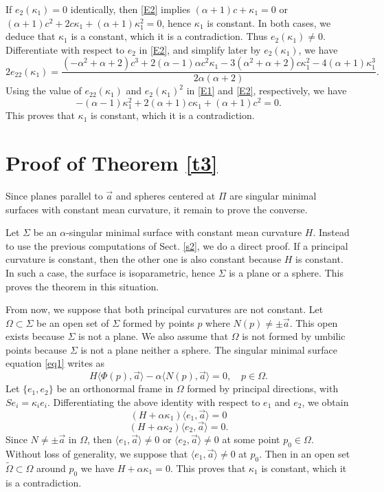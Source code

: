 \documentclass{birkjour}
\theoremstyle{definition}
\theoremstyle{remark}
\numberwithin{equation}{section}
\begin{document}
If $e_2(\kappa_1)=0$ identically, then \eqref{E2} implies $(\alpha+1)c+\kappa_1=0$ or $(\alpha +1) c^2+2 c \kappa_1+(\alpha +1)\kappa_1^2=0$, hence $\kappa_1$ is constant. In both cases, we deduce that $\kappa_1$ is a constant, which it is a contradiction. Thus $e_2(\kappa_1)\not=0$.  Differentiate  with respect to $e_2$ in \eqref{E2}, and   simplify later  by $e_2(\kappa_1)$, we have 
 $$2 e_{22}(\kappa_1)= \frac{\left(-\alpha ^2+\alpha +2\right) c^3+2 (\alpha -1) \alpha  c^2 \kappa_1-3 \left(\alpha ^2+\alpha +2\right) c \kappa_1^2-4 (\alpha +1) \kappa_1^3}{2 \alpha  (\alpha +2)}.$$
Using the value of $e_{22}(\kappa_1)$ and $e_2(\kappa_1)^2$ in \eqref{E1} and \eqref{E2}, respectively, we have 
 $$-(\alpha -1) \kappa_1^2+2 (\alpha +1) c \kappa_1+(\alpha +1) c^2=0.$$
 This proves that $\kappa_1$ is constant, which it is a contradiction.
\section{Proof of Theorem \ref{t3}}\label{s6}

Since planes parallel to $\vec{a}$ and spheres centered at $\Pi$ are singular minimal surfaces with constant mean curvature, it remain to prove the converse. 

  Let $\Sigma$ be an $\alpha$-singular minimal surface with  constant mean curvature $H$.     Instead to use the previous computations of Sect. \ref{s2}, we do a direct proof. If a principal curvature is constant, then the other one is also constant because $H$ is constant. In such a case, the surface is isoparametric, hence   $\Sigma$ is a plane or a sphere. This proves the theorem in this situation. 
  
  From now, we suppose that both principal curvatures are not constant.   Let  $\Omega\subset\Sigma$ be an open set of $\Sigma$ formed by points $p$ where $ N(p)\not=\pm \vec{a}$. This open exists because $\Sigma$ is not a plane. We also assume that $\Omega$ is not formed by umbilic points because $\Sigma$ is not a plane neither a sphere. 
    The singular minimal surface equation \eqref{eq1} writes as 
$$H\langle\Phi(p),\vec{a}\rangle-\alpha\langle N(p),\vec{a}\rangle=0,\quad p\in \Omega.$$
Let $\{e_1,e_2\}$ be an orthonormal frame in $\Omega$ formed by principal directions, with $Se_i=\kappa_i e_i$. Differentiating the above identity  with respect to $e_1$ and $e_2$, we obtain 
$$(H+\alpha\kappa_1)\langle e_1,\vec{a}\rangle=0$$
$$(H+\alpha\kappa_2)\langle e_2,\vec{a}\rangle=0.$$
Since $N\not=\pm\vec{a}$ in $\Omega$, then $\langle e_1,\vec{a}\rangle\not=0$ or $\langle e_2,\vec{a}\rangle\not=0$ at some point   $p_0\in \Omega$. Without loss of generality, we suppose that $\langle e_1,\vec{a}\rangle\not=0$ at $p_0$. Then in an open set $\widetilde{\Omega}\subset\Omega$ around $p_0$ we have   $H+\alpha\kappa_1=0$. This proves that $\kappa_1$  is constant, which it is a contradiction.    
 
\end{document}

